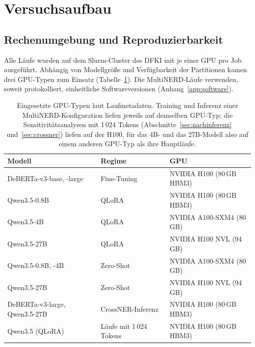 \section{Versuchsaufbau}
\label{sec:versuchsaufbau}

\subsection{Rechenumgebung und Reproduzierbarkeit}
\label{sec:rechenumgebung}

Alle Läufe wurden auf dem Slurm-Cluster des DFKI mit je einer GPU pro Job
ausgeführt.
Abhängig von Modellgröße und Verfügbarkeit der Partitionen kamen drei
GPU-Typen zum Einsatz (Tabelle~\ref{tab:hardware}).
Die MultiNERD-Läufe verwenden, soweit protokolliert, einheitliche
Softwareversionen (Anhang~\ref{app:software}).

\begin{table}[ht]
    \centering
    \small
    \caption[Eingesetzte GPU-Typen]{Eingesetzte GPU-Typen laut Laufmetadaten.
    Training und Inferenz einer MultiNERD-Konfiguration liefen jeweils
    auf demselben GPU-Typ; die Sensitivitätsanalysen mit 1\,024 Tokens
    (Abschnitte~\ref{sec:nachinferenz} und~\ref{sec:crossner}) liefen
    auf der H100, für das 4B- und das 27B-Modell also auf einem anderen
    GPU-Typ als ihre Hauptläufe.}
    \label{tab:hardware}
    \setlength{\tabcolsep}{4pt}
    \begin{tabular}{lll}
        \toprule
        \textbf{Modell} & \textbf{Regime} & \textbf{GPU} \\
        \midrule
        DeBERTa-v3-base, -large & Fine-Tuning & NVIDIA H100 (80\,GB HBM3) \\
    \addlinespace
        Qwen3.5-0.8B            & QLoRA       & NVIDIA H100 (80\,GB HBM3) \\
    \addlinespace
        Qwen3.5-4B              & QLoRA       & NVIDIA A100-SXM4 (80\,GB) \\
    \addlinespace
        Qwen3.5-27B             & QLoRA       & NVIDIA H100 NVL (94\,GB) \\
    \addlinespace
        Qwen3.5-0.8B, -4B       & Zero-Shot   & NVIDIA A100-SXM4 (80\,GB) \\
    \addlinespace
        Qwen3.5-27B             & Zero-Shot   & NVIDIA H100 NVL (94\,GB) \\
        \midrule
        DeBERTa-v3-large, Qwen3.5-27B & CrossNER-Inferenz & NVIDIA H100 (80\,GB HBM3) \\
    \addlinespace
        Qwen3.5 (QLoRA)         & Läufe mit 1\,024 Tokens & NVIDIA H100 (80\,GB HBM3) \\
        \bottomrule
    \end{tabular}
\end{table}


